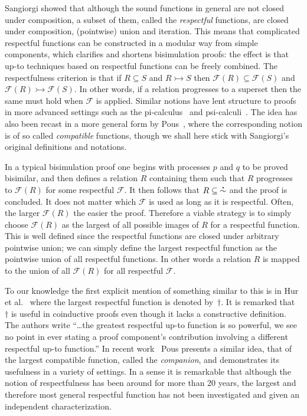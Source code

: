 \documentclass{CSML}
\theoremstyle{definition}
\newcommand{\bisim}{\stackrel{\mbox{\bf .}}{\sim}}
\newcommand{\progress}{\rightarrowtail}
\newcommand{\F}{\mathcal{F}}
\begin{document}
Sangiorgi showed that although the sound functions in general are not
closed under composition, a subset of them, called the {\em
  respectful} functions, are closed under composition, (pointwise)
union and iteration. This means that complicated respectful functions
can be constructed in a modular way from simple components, which
clarifies and shortens bisimulation proofs: the effect is that up-to
techniques based on respectful functions can be freely combined. The
respectfulness criterion is that if $R \subseteq S$ and $R\progress S$
then $\F(R) \subseteq \F(S)$ and $\F(R) \progress \F(S)$. In other
words, if a relation progresses to a superset then the same must hold
when $\F$ is applied. Similar notions have lent structure to proofs in
more advanced settings such as the pi-calculus~\cite{Hirschkoff1997}
and psi-calculi~\cite{Pohjola2016}. The idea has also been recast in a
more general form by Pous~\cite{Pous2007}, where the corresponding
notion is of so called {\em compatible} functions, though we shall
here stick with Sangiorgi's original definitions and notations.

In a typical bisimulation proof one begins with processes $p$ and $q$
to be proved bisimilar, and then defines a relation $R$ containing
them such that $R$ progresses to $\F(R)$ for some respectful $\F$. It
then follows that $R \subseteq \mathop{\bisim}$ and the proof is
concluded. It does not matter which $\F$ is used as long as it is
respectful. Often,  the larger $\F(R)$ the easier the proof. Therefore
a viable strategy is to simply choose $\F(R)$ as the largest of all
possible images of $R$ for a respectful function. This is well defined
since the respectful functions are closed under arbitrary pointwise
union; we can simply define the largest respectful function as the
pointwise union of all respectful functions. In other words a relation
$R$ is mapped to the union of all $\F(R)$ for all respectful $\F$.

To our knowledge the first explicit mention of something similar to
this is in Hur et al.~\cite{Hur2013} where the largest respectful
function is denoted by~$\dagger$. It is remarked that~$\dagger$ is
useful in coinductive proofs even though it lacks a constructive
definition. The authors write ``\ldots the greatest respectful up-to
function is so powerful, we see no point in ever stating a proof
component's contribution involving a different respectful up-to
function.''  In recent work~\cite{Pous2016} Pous presents a similar
idea, that of the largest compatible function, called the {\em
  companion}, and demonstrates its usefulness in a variety of
settings.  In a sense it is remarkable that although the notion of
respectfulness has been around for more than 20 years, the largest and
therefore most general respectful function has not been investigated
and given an independent characterization.
\end{document}
